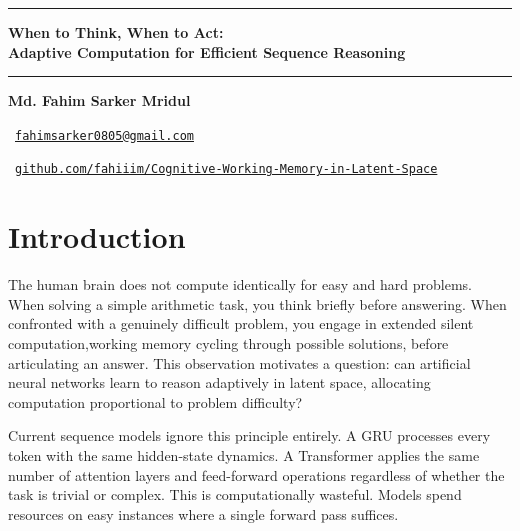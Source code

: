 \documentclass[11pt]{article}
\makeatletter
\newcommand{\customtitle}{%
\begin{center}
\rule{\linewidth}{5pt}
\vspace{0.4cm}

{\LARGE\bfseries When to Think, When to Act: \\ Adaptive Computation for Efficient Sequence Reasoning}

\vspace{0.4cm}
\rule{\linewidth}{1.5pt}
\vspace{0.8cm}

{\large\bfseries Md. Fahim Sarker Mridul}

\vspace{0.4cm}
{\normalsize 
\faEnvelope \ \href{mailto:fahimsarker0805@gmail.com}{\texttt{fahimsarker0805@gmail.com}}
}

\vspace{0.2cm}
{\normalsize 
\href{https://github.com/yourusername/your-repo}{\textcolor{githubblue}{\faGithub}} \ 
\href{https://github.com/fahiiim/Cognitive-Working-Memory-in-Latent-Space.git}{\texttt{github.com/fahiiim/Cognitive-Working-Memory-in-Latent-Space}}
}

\vspace{0.5cm}

\end{center}
}
\makeatother
\begin{document}
\customtitle

\begin{abstract}
This paper introduces Gated Latent Working Memory (GLWM), a novel architecture that decouples silent internal reasoning from explicit token emission through adaptive computation. Unlike standard sequence models (GRUs, Transformers) that apply identical computation to every problem regardless of complexity, GLWM learns to dynamically allocate computational resources based on task difficulty via a learned confidence gate. I implement GLWM with a residual latent reasoning loop trained using PonderNet, compare it against GRU (2014), Vanilla Transformer (2017), and Modern Transformer (2020+), and demonstrate that GLWM achieves comparable accuracy while using 88.7\% fewer FLOPs than state-of-the-art Transformers. I further show that GLWM exhibits three properties absent in baseline models: graceful capacity degradation with problem difficulty, high metacognitive calibration (ECE = 0.0014), and structured latent reasoning trajectories visible through t-SNE analysis. While the current evaluation uses multi-digit addition as a proof-of-concept, I discuss how this work lays groundwork for efficient reasoning in more complex domains. The architecture is fully differentiable during training and amenable to hardware optimization, suggesting practical utility for resource-constrained environments.
\end{abstract}

\section{Introduction}

The human brain does not compute identically for easy and hard problems. When solving a simple arithmetic task, you think briefly before answering. When confronted with a genuinely difficult problem, you engage in extended silent computation,working memory cycling through possible solutions, before articulating an answer. This observation motivates a question: can artificial neural networks learn to reason adaptively in latent space, allocating computation proportional to problem difficulty?

Current sequence models ignore this principle entirely. A GRU processes every token with the same hidden-state dynamics. A Transformer applies the same number of attention layers and feed-forward operations regardless of whether the task is trivial or complex. This is computationally wasteful. Models spend resources on easy instances where a single forward pass suffices.
\end{document}
